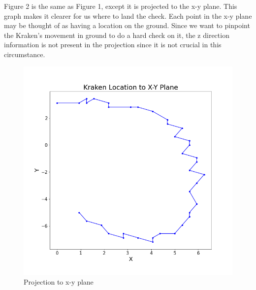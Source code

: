 \documentclass[12pt]{article}%
\begin{document}
Figure 2 is the same as Figure 1, except it is projected to the x-y plane. This graph makes it clearer for us where to land the check. Each point in the x-y plane may be thought of as having a location on the ground. Since we want to pinpoint the Kraken's movement in ground to do a hard check on it, the z direction information is not present in the projection since it is not crucial in this circumstance. 
\begin{figure}[H]
\centering
\includegraphics[width=1\textwidth]{projection.png}
\caption{Projection to x-y plane}\label{fig:projection}
\end{figure}
\end{document}
